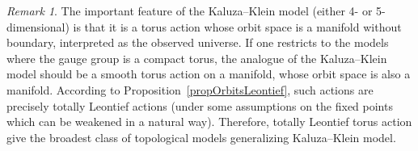 \documentclass[english,12pt,oneside]{amsproc}
\newcounter{stmcounter}[section]
\numberwithin{equation}{section}
\theoremstyle{plain}
\theoremstyle{definition}
\theoremstyle{remark}
\newtheorem{rem}[stmcounter]{Remark}
\begin{document}
\begin{rem}
The important feature of the Kaluza--Klein model (either 4- or 5-dimensional) is that it is a torus action whose orbit space is a manifold without boundary, interpreted as the observed universe. If one restricts to the models where the gauge group is a compact torus, the analogue of the Kaluza--Klein model should be a smooth torus action on a manifold, whose orbit space is also a manifold. According to Proposition~\ref{propOrbitsLeontief}, such actions are precisely totally Leontief actions (under some assumptions on the fixed points which can be weakened in a natural way). Therefore, totally Leontief torus action give the broadest class of topological models generalizing Kaluza--Klein model.
\end{rem}
\end{document}
